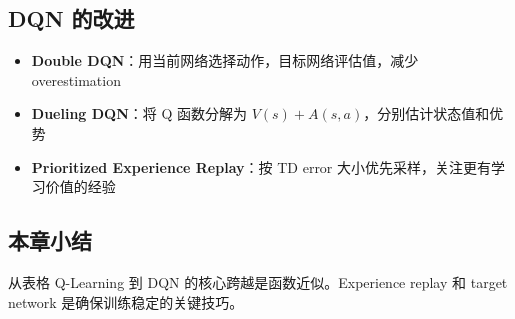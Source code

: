\subsection{DQN 的改进}

\begin{itemize}
    \item \textbf{Double DQN}：用当前网络选择动作，目标网络评估值，减少 overestimation
    \item \textbf{Dueling DQN}：将 Q 函数分解为 $V(s) + A(s, a)$，分别估计状态值和优势
    \item \textbf{Prioritized Experience Replay}：按 TD error 大小优先采样，关注更有学习价值的经验
\end{itemize}

\subsection{本章小结}

从表格 Q-Learning 到 DQN 的核心跨越是函数近似。Experience replay 和 target network 是确保训练稳定的关键技巧。

